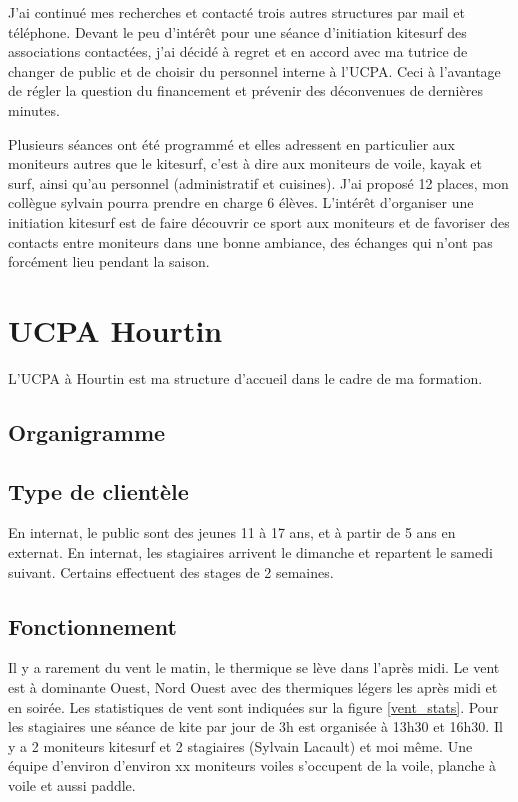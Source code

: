 \documentclass[12pt,a4paper]{report}
\begin{document}
J'ai continué mes recherches et contacté trois autres structures par mail et
téléphone. 
Devant le peu d’intérêt pour une séance d'initiation kitesurf
des associations contactées, j'ai décidé à regret et en accord avec ma tutrice
de changer de public et de choisir du personnel interne à l'UCPA.
Ceci à l'avantage de régler la question du financement et prévenir des
déconvenues de dernières minutes.

Plusieurs séances ont été programmé et elles adressent en particulier
aux moniteurs autres que le kitesurf, c'est à dire aux moniteurs de voile, kayak et surf, 
ainsi qu'au personnel (administratif et cuisines).
J'ai  proposé 12 places, mon collègue sylvain pourra prendre en charge 6 élèves.
L'intér\^et d'organiser une initiation kitesurf est de faire découvrir ce
sport aux moniteurs et  de favoriser des contacts entre moniteurs dans
une bonne ambiance, des échanges qui n'ont pas forcément lieu pendant la saison.

\section{UCPA Hourtin}
L'UCPA à Hourtin est ma structure d'accueil dans le cadre de ma formation.
\subsection{Organigramme}
\subsection{Type de clientèle}
En internat, le public sont des jeunes 11 à 17 ans, et  à partir de 5 ans  en externat.
En internat, les stagiaires arrivent le dimanche et repartent le samedi suivant.
Certains effectuent des stages de 2 semaines.
\subsection{Fonctionnement}
Il y a rarement du vent le matin, le thermique se lève dans l'après midi.
Le vent est à dominante Ouest, Nord Ouest avec des thermiques légers les après midi et 
en soirée. Les statistiques de vent sont indiquées sur la figure \ref{vent_stats}.
Pour les stagiaires une séance de kite par jour de 3h est organisée à 13h30 et 16h30.
Il y a 2 moniteurs kitesurf et 2 stagiaires (Sylvain Lacault) et moi m\^eme.
Une équipe d'environ d'environ xx moniteurs voiles s'occupent de la voile, planche à voile
et aussi paddle.
\end{document}
